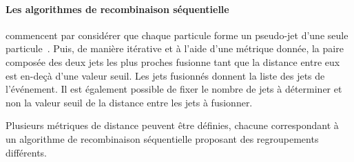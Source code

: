 \paragraph{Les algorithmes de recombinaison séquentielle} commencent par considérer que chaque particule forme un pseudo-jet d'une seule particule~\cite{Cacciari:2011ma}.
Puis, de manière itérative et à l'aide d'une métrique donnée, la paire composée des deux jets les plus proches fusionne tant que la distance entre eux est en-deçà d'une valeur seuil. Les jets fusionnés donnent la liste des jets de l'événement. Il est également possible de fixer le nombre de jets à déterminer et non la valeur seuil de la distance entre les jets à fusionner.
\par Plusieurs métriques de distance peuvent être définies, chacune correspondant à un algorithme de recombinaison séquentielle proposant des regroupements différents.
